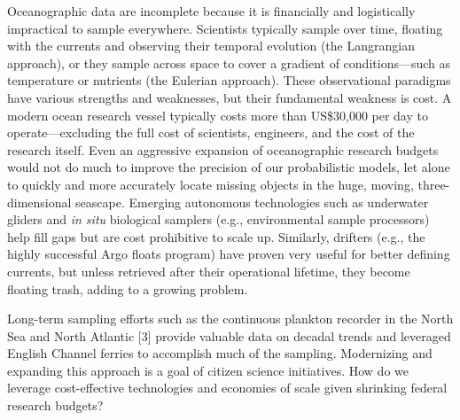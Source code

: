 Oceanographic data are incomplete because it is financially and logistically impractical to sample everywhere. Scientists typically sample over time, floating with the currents and observing their temporal evolution (the Langrangian approach), or they sample across space to cover a gradient of conditions—such as temperature or nutrients (the Eulerian approach). These observational paradigms have various strengths and weaknesses, but their fundamental weakness is cost. A modern ocean research vessel typically costs more than US\$30,000 per day to operate—excluding the full cost of scientists, engineers, and the cost of the research itself. Even an aggressive expansion of oceanographic research budgets would not do much to improve the precision of our probabilistic models, let alone to quickly and more accurately locate missing objects in the huge, moving, three-dimensional seascape. Emerging autonomous technologies such as underwater gliders and {\em in situ} biological samplers (e.g., environmental sample processors) help fill gaps but are cost prohibitive to scale up. Similarly, drifters (e.g., the highly successful Argo floats program) have proven very useful for better defining currents, but unless retrieved after their operational lifetime, they become floating trash, adding to a growing problem.

Long-term sampling efforts such as the continuous plankton recorder in the North Sea and North Atlantic [3] provide valuable data on decadal trends and leveraged English Channel ferries to accomplish much of the sampling. Modernizing and expanding this approach is a goal of citizen science initiatives. How do we leverage cost-effective technologies and economies of scale given shrinking federal research budgets?